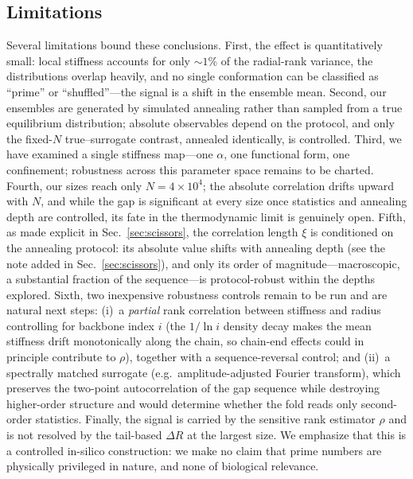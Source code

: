 \documentclass[11pt]{article}
\begin{document}
\subsection{Limitations}\label{sec:limitations}
Several limitations bound these conclusions. First, the effect is quantitatively
small: local stiffness accounts for only $\sim\!1\%$ of the radial-rank variance, the
distributions overlap heavily, and no single conformation can be classified as
``prime'' or ``shuffled''---the signal is a shift in the ensemble mean. Second, our
ensembles are generated by simulated annealing rather than sampled from a true
equilibrium distribution; absolute observables depend on the protocol, and only the
fixed-$N$ true--surrogate contrast, annealed identically, is controlled. Third, we
have examined a single stiffness map---one $\alpha$, one functional form, one
confinement; robustness across this parameter space remains to be charted. Fourth, our
sizes reach only $N = 4\times10^4$; the absolute correlation drifts upward with $N$,
and while the gap is significant at every size once statistics and annealing depth are
controlled, its fate in the thermodynamic limit is genuinely open. Fifth, as made
explicit in Sec.~\ref{sec:scissors}, the correlation length $\xi$ is conditioned on
the annealing protocol: its absolute value shifts with annealing depth (see the note
added in Sec.~\ref{sec:scissors}), and only its order of
magnitude---macroscopic, a substantial fraction of the sequence---is
protocol-robust within the depths explored. Sixth, two inexpensive robustness
controls remain to be run and are natural next steps: (i)~a \emph{partial} rank
correlation between stiffness and radius controlling for backbone index $i$ (the
$1/\ln i$ density decay makes the mean stiffness drift monotonically along the
chain, so chain-end effects could in principle contribute to $\rho$), together with
a sequence-reversal control; and (ii)~a spectrally matched surrogate (e.g.\
amplitude-adjusted Fourier transform), which preserves the two-point
autocorrelation of the gap sequence while destroying higher-order structure and
would determine whether the fold reads only second-order statistics. Finally, the
signal is carried by the sensitive rank estimator $\rho$ and is not resolved by the
tail-based $\Delta R$ at the largest size. We emphasize that this is a controlled
in-silico construction: we make no claim that prime numbers are physically
privileged in nature, and none of biological relevance.
\end{document}
